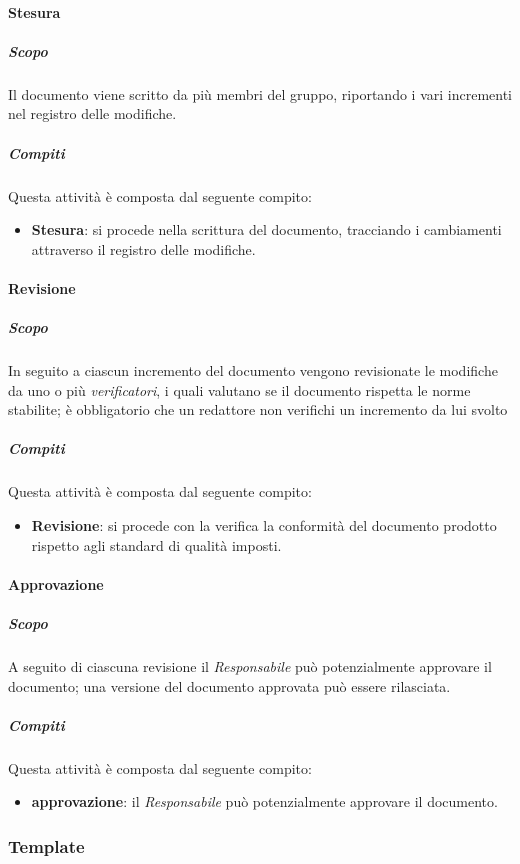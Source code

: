 \paragraph{Stesura}
\label{par:stesura}
\subparagraph{Scopo}
\label{par:stesura:scopo}
Il documento viene scritto da più membri del gruppo, riportando i vari incrementi nel registro delle modifiche.
\subparagraph{Compiti}
\label{par:stesura:compiti}
Questa attività è composta dal seguente compito:
\begin{itemize}
    \item \textbf{Stesura}: si procede nella scrittura del documento, tracciando i cambiamenti attraverso il registro delle modifiche.
\end{itemize}

\paragraph{Revisione}
\label{par:revisione}
\subparagraph{Scopo}
\label{par:revizione:scopo}
In seguito a ciascun incremento del documento vengono revisionate le modifiche da uno o più \emph{verificatori}, i quali valutano se il documento rispetta le norme stabilite; è obbligatorio che un redattore non verifichi un incremento da lui svolto
\subparagraph{Compiti}
\label{par:revisione:compiti}
Questa attività è composta dal seguente compito:
\begin{itemize}
    \item \textbf{Revisione}: si procede con la verifica la conformità del documento prodotto rispetto agli standard di qualità imposti.
\end{itemize}

\paragraph{Approvazione}
\label{par:approvazione}
\subparagraph{Scopo}
\label{par:approvazione:scopo}
A seguito di ciascuna revisione il \emph{Responsabile} può potenzialmente approvare il documento; una versione del documento approvata può essere rilasciata.
\subparagraph{Compiti}
\label{par:approvazione:compiti}
Questa attività è composta dal seguente compito:
\begin{itemize}
    \item \textbf{approvazione}: il \emph{Responsabile} può potenzialmente approvare il documento.
\end{itemize}


\subsubsection{Template}
\label{ssub:template}

